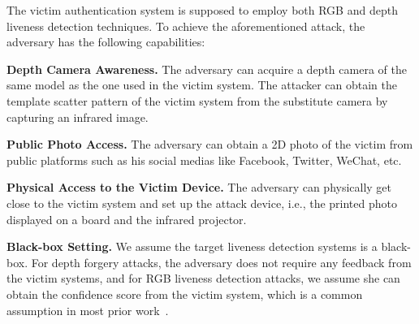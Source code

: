 The victim authentication system is supposed to employ both RGB and depth liveness detection techniques. To achieve the aforementioned attack, the adversary has the following capabilities:

\textbf{Depth Camera Awareness.}
The adversary can acquire a depth camera of the same model as the one used in the victim system. The attacker can obtain the template scatter pattern of the victim system from the substitute camera by capturing an infrared image.


\textbf{Public Photo Access.}
The adversary can obtain a  2D photo of the victim from  public platforms such as his social medias like Facebook, Twitter, WeChat, etc.

\textbf{Physical Access to the Victim Device.} The adversary can physically get close to the victim system and set up the attack device, i.e., the printed photo displayed on a board and the infrared projector.


\textbf{Black-box Setting.} 
We assume the target liveness detection systems is a black-box. For depth forgery attacks, the adversary does not require any feedback from the victim systems, and for RGB liveness detection attacks, we assume she can obtain the confidence score from the victim system, which is a common assumption in most prior work~\cite{guo2019simple}.



